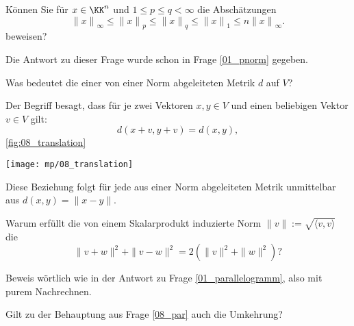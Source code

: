 \begin{frage}\label{08_pnormaq}
  Können Sie für $x\in \KK^n$ und $1\le p \le q < \infty$ die 
  Abschätzungen 
  \[
  {\| x \|}_\infty \le {\| x \|}_p \le {\| x \|}_q \le {\| x \|}_1 
  \le n {\| x \|}_\infty .  
  \]
  beweisen?
\end{frage}

\begin{antwort}
  Die Antwort zu dieser Frage wurde schon in Frage 
  \ref{01_pnorm} gegeben.\AntEnd
\end{antwort}

\begin{frage}
  Was bedeutet die  einer 
  von einer Norm abgeleiteten Metrik $d$ auf $V$?
\end{frage}


\begin{antwort}
  Der Begriff besagt, dass für je zwei Vektoren $x, y \in V$ 
  und einen beliebigen Vektor $v\in V$ gilt: 
  \[
  d(x+v, y+v )= d(x,y),
  \]
  \sieheAbbildung\ref{fig:08_translation}

  \begin{center}
    \texttt{[image: mp/08\_translation]}
    \label{fig:08_translation}
  \end{center}

  Diese Beziehung folgt für jede aus einer Norm abgeleiteten Metrik unmittelbar 
  aus $d(x,y)=\| x-y \|$. 
  \AntEnd
\end{antwort}

\begin{frage}\label{08_par}
  Warum erfüllt die von einem Skalarprodukt induzierte Norm 
  $ \| v \| := \sqrt{ \langle v,v \rangle }$ die 
  \[
  \| v+w \|^2 + \|v-w \|^2 = 2 \left( \| v \|^2 + \| w \|^2 \right)
  \text{?}
  \]
\end{frage}

\begin{antwort}
  Beweis wörtlich wie in der Antwort zu Frage 
  \ref{01_parallelogramm}, also 
  mit purem Nachrechnen.  
  \AntEnd
\end{antwort}

\begin{frage}
  Gilt zu der Behauptung aus Frage \ref{08_par} auch die Umkehrung?
\end{frage}

